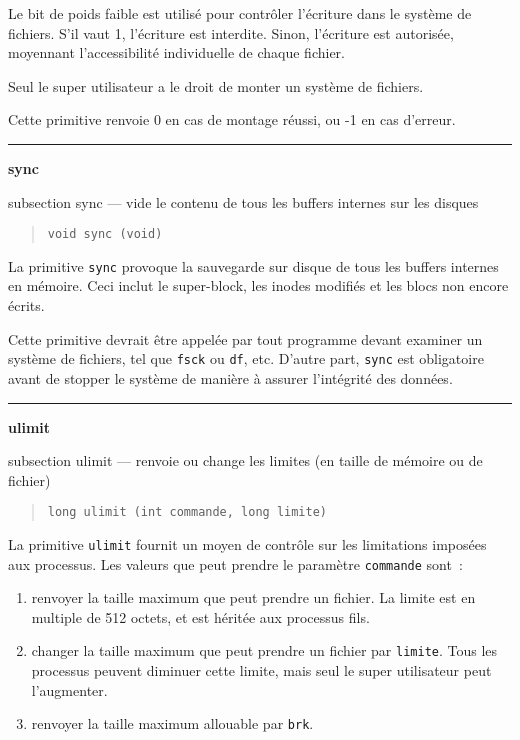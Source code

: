 \documentclass [twoside] {report}
\newcommand {\primitive} [1]
    {
	\phantomsection
	{\large \bf #1}
	\addcontentsline {toc} {subsection} {#1}
    }
\newcommand {\separation}
    {
	\vspace {5mm}
	\nopagebreak
	\hrule
    }
\begin{document}
Le bit de poids faible est utilisé pour contrôler
l'écriture dans le système de fichiers. S'il vaut
1, l'écriture est interdite. Sinon, l'écriture est
autorisée, moyennant l'accessibilité individuelle
de chaque fichier.

Seul le super utilisateur a le droit de monter un
système de fichiers.

Cette primitive renvoie 0 en cas de montage
réussi, ou -1 en cas d'erreur.




\separation
\primitive {sync} --- vide le contenu de tous les buffers internes sur les disques

\begin {quote}
\begin {verbatim}
void sync (void)
\end{verbatim}
\end {quote}

La primitive {\tt sync} provoque la sauvegarde sur
disque de tous les buffers internes en mémoire.
Ceci inclut le super-block, les inodes modifiés et
les blocs non encore écrits.

Cette primitive devrait être appelée par tout
programme devant examiner un système de fichiers,
tel que {\tt fsck} ou {\tt df}, etc. D'autre part,
{\tt sync} est obligatoire avant de stopper le
système de manière à assurer l'intégrité des
données.




\separation
\primitive {ulimit} --- renvoie ou change les limites (en taille de mémoire ou de fichier)

\begin {quote}
\begin {verbatim}
long ulimit (int commande, long limite)
\end{verbatim}
\end {quote}

La primitive {\tt ulimit} fournit un moyen de
contrôle sur les limitations imposées aux
processus. Les valeurs que peut prendre le
paramètre {\tt commande} sont~:

\begin {enumerate}
    \item renvoyer la taille maximum que peut prendre
	un fichier. La limite est en multiple de 512
	octets, et est héritée aux processus fils.
    \item changer la taille maximum que peut prendre
	un fichier par {\tt limite}. Tous les processus
	peuvent diminuer cette limite, mais seul le super
	utilisateur peut l'augmenter.
    \item renvoyer la taille maximum allouable par {\tt brk}.
\end {enumerate}
\end{document}
